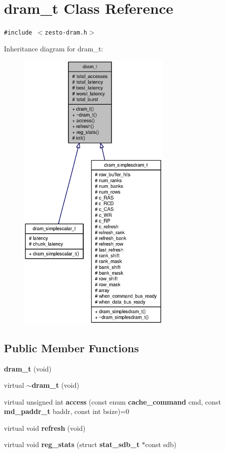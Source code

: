 \section{dram\_\-t Class Reference}
\label{classdram__t}
{\tt \#include $<$zesto-dram.h$>$}

Inheritance diagram for dram\_\-t:\nopagebreak
\begin{figure}[H]
\begin{center}
\leavevmode
\includegraphics[height=400pt]{classdram__t__inherit__graph}
\end{center}
\end{figure}
\subsection*{Public Member Functions}
\begin{CompactItemize}
\item 
{\bf dram\_\-t} (void)
\item 
virtual {\bf $\sim$dram\_\-t} (void)
\item 
virtual unsigned int {\bf access} (const enum {\bf cache\_\-command} cmd, const {\bf md\_\-paddr\_\-t} baddr, const int bsize)=0
\item 
virtual void {\bf refresh} (void)
\item 
virtual void {\bf reg\_\-stats} (struct {\bf stat\_\-sdb\_\-t} $\ast$const sdb)
\end{CompactItemize}
